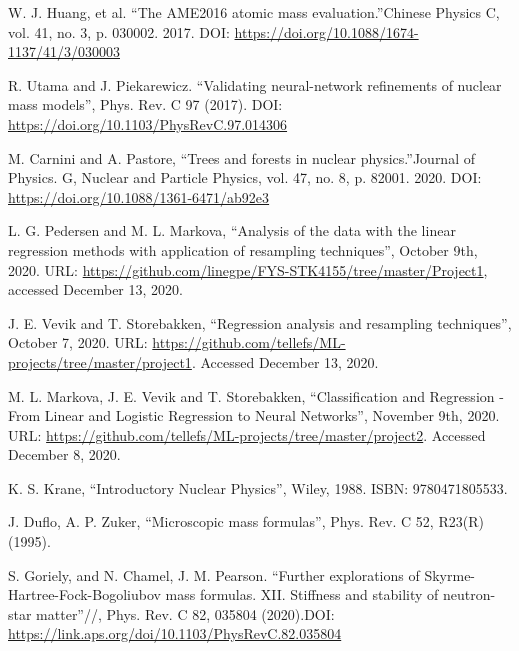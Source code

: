 \documentclass[numberedappendix, twocolappendix]{emulateapj}
\begin{document}
\begin{thebibliography}

W. J. Huang, et al. \textquotedblleft The AME2016 atomic mass evaluation.\textquotedblright Chinese Physics C, vol. 41, no. 3, p. 030002. 2017. DOI: \url{https://doi.org/10.1088/1674-1137/41/3/030003}

R. Utama and J. Piekarewicz. \textquotedblleft Validating neural-network refinements of nuclear mass models\textquotedblright,  Phys. Rev. C 97 (2017). DOI: \url{https://doi.org/10.1103/PhysRevC.97.014306}

M. Carnini and A. Pastore, \textquotedblleft Trees and forests in nuclear physics.\textquotedblright Journal of Physics. G, Nuclear and Particle Physics, vol. 47, no. 8, p. 82001. 2020. DOI: \url{https://doi.org/10.1088/1361-6471/ab92e3}

L. G. Pedersen and M. L. Markova, \textquotedblleft Analysis of the data with the linear regression methods with application of resampling techniques\textquotedblright, October 9th, 2020. URL: \url{https://github.com/linegpe/FYS-STK4155/tree/master/Project1}, accessed December 13, 2020.

J. E. Vevik and T. Storebakken, \textquotedblleft Regression analysis and resampling techniques\textquotedblright, October 7, 2020. URL: \url{https://github.com/tellefs/ML-projects/tree/master/project1}. Accessed December 13, 2020.

M. L. Markova, J. E. Vevik and T. Storebakken, \textquotedblleft Classification and Regression - From Linear and Logistic Regression to Neural Networks\textquotedblright, November 9th, 2020. URL: \url{https://github.com/tellefs/ML-projects/tree/master/project2}. Accessed December 8, 2020.

K. S. Krane, \textquotedblleft Introductory Nuclear Physics\textquotedblright, Wiley, 1988. ISBN: 9780471805533.

 J. Duflo, A. P. Zuker, \textquotedblleft Microscopic mass formulas\textquotedblright,  Phys. Rev. C 52, R23(R) (1995).

S. Goriely, and  N. Chamel, J. M. Pearson. \textquotedblleft Further explorations of Skyrme-Hartree-Fock-Bogoliubov mass formulas. XII. Stiffness and stability of neutron-star matter\textquotedblright//, Phys. Rev. C 82, 035804 (2020).DOI: \url{https://link.aps.org/doi/10.1103/PhysRevC.82.035804}



\end{thebibliography}
\end{document}
